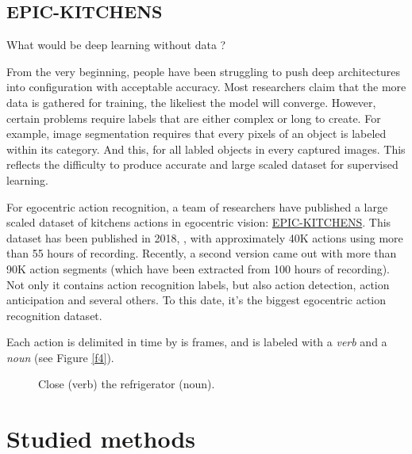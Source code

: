 \documentclass[12pt, a4paper]{report}
\begin{document}
			\subsection{EPIC-KITCHENS}\label{epic_kitchen}
				What would be deep learning without data ?\par
				From the very beginning, people have been struggling to push deep architectures into configuration with acceptable accuracy.
				Most researchers claim that the more data is gathered for training, the likeliest the model will converge.
				However, certain problems require labels that are either complex or long to create.
				For example, image segmentation requires that every pixels of an object is labeled within its category.
				And this, for all labled objects in every captured images.
				This reflects the difficulty to produce accurate and large scaled dataset for supervised learning.\par
				For egocentric action recognition, a team of researchers have published a large scaled dataset of kitchens actions in egocentric vision: \href{https://epic-kitchens.github.io/2021}{EPIC-KITCHENS}.
				This dataset has been published in 2018, \cite{damen_18}, with approximately 40K actions using more than 55 hours of recording.
				Recently, a second version came out with more than 90K action segments (which have been extracted from 100 hours of recording).
				Not only it contains action recognition labels, but also action detection, action anticipation and several others.
				To this date, it's the biggest egocentric action recognition dataset.\par
				Each action is delimited in time by is frames, and is labeled with a {\itshape verb} and a {\itshape noun} (see Figure \ref{f4}).
				\begin{figure}[!tbp]
					\centering
					\caption{Close ({\small verb}) the refrigerator ({\small noun}).}
				\end{figure}

		\section{Studied methods}
\end{document}
